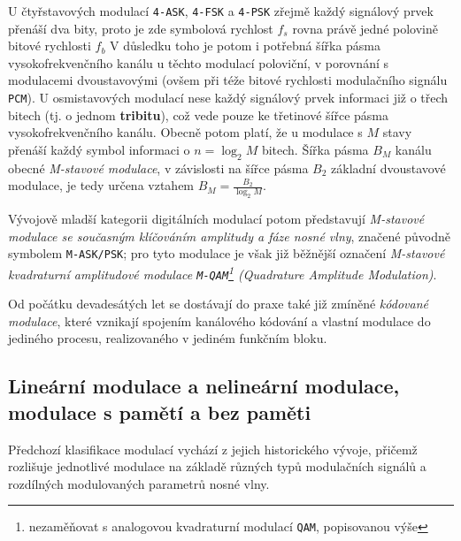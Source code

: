       U čtyřstavových modulací \texttt{4-ASK}, \texttt{4-FSK} a \texttt{4-PSK} zřejmě každý 
      signálový prvek přenáší dva bity, proto je zde symbolová rychlost \(f_s\) rovna právě jedné 
      polovině bitové rychlosti \(f_b\) V důsledku toho je potom i potřebná šířka pásma 
      vy\-so\-ko\-frek\-ven\-ční\-ho kanálu u těchto modulací poloviční, v porovnání s modulacemi 
      dvoustavovými (ovšem při téže bitové rychlosti modulačního signálu \texttt{PCM}). U 
      osmistavových modulací nese každý signálový prvek informaci již o třech bitech (tj. o jednom 
      \textbf{tribitu}), což vede pouze ke třetinové šířce pásma vysokofrekvenčního kanálu. Obecně 
      potom platí, že u modulace s \(M\) stavy přenáší každý symbol informaci o \(n = \log_2 M\) 
      bitech. Šířka pásma \(B_M\) kanálu obecné \emph{M-stavové modulace}, v závislosti na šířce 
      pásma \(B_2\) základní dvoustavové modulace, je tedy určena vztahem \(B_M = \frac{B_2}{\log_2 
      M}.\) 
      
      Vývojově mladší kategorii digitálních modulací potom představují \emph{M-stavové modulace se 
      současným klíčováním amplitudy a fáze nosné vlny}, značené původně symbolem 
      \texttt{M-ASK/PSK}; pro tyto modulace je však již běžnější označení \emph{M-stavové 
      kvadraturní amplitudové modulace \texttt{M-QAM}\footnote{nezaměňovat s analogovou kvadraturní 
      modulací \texttt{QAM}, popisovanou výše} (Quadrature Amplitude Modulation)}.
      
      Od počátku devadesátých let se dostávají do praxe také již zmíněné \emph{kódované modulace}, 
      které vznikají spojením kanálového kódování a vlastní modulace do jediného procesu, 
      realizovaného v jediném funkčním bloku. 
    
    \subsection{Lineární modulace a nelineární modulace, modulace s pamětí a bez paměti}
      Předchozí klasifikace modulací vychází z jejich historického vývoje, přičemž rozlišuje 
      jednotlivé modulace na základě různých typů modulačních signálů a rozdílných modulovaných 
      parametrů nosné vlny.
      
